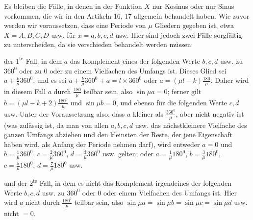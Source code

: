 \begingroup
\renewcommand{\arraystretch}{1.45}
Es bleiben die Fälle, in denen in der Funktion $X$ nur Kosinus oder nur Sinus vorkommen, die wir in den Artikeln 16, 17 allgemein behandelt haben. Wie zuvor werden wir voraussetzen, dass eine Periode von $\mu$ Gliedern gegeben ist, etwa $X=A,B,C,D$ usw. für $x=a,b,c,d$ usw. Hier sind jedoch zwei Fälle sorgfältig zu unterscheiden, da sie verschieden behandelt werden müssen:

der $1^{\mathrm{te}}$ Fall, in dem $a$ das Komplement eines der folgenden Werte $b,c,d$ usw. zu $360^{0}$ oder zu $0$ oder zu einem Vielfachen des Umfangs ist. Dieses Glied sei $a+\frac{k}{\mu}360^{0}$,
und es sei $a+\frac{k}{\mu}360^{0}+a=l\times360^{0}$ oder $a=(\mu l-k)\frac{180}{\mu}$. Daher wird in diesem Fall $a$ durch $\frac{180}{\mu}$ teilbar sein, also $\sin\mu a=0$; ferner gilt $b=(\mu l-k+2)\frac{180^{0}}{\mu}$ und $\sin\mu b=0$, und ebenso für die folgenden Werte $c,d$ usw. Unter der Voraussetzung also, dass $a$ kleiner als $\frac{360^{0}}{\mu}$, aber nicht negativ ist (was zulässig ist, da man von allen $a,b,c,d$ usw. das nächstkleinere Vielfache des ganzen Umfangs abziehen und den kleinsten der Reste, der jene Eigenschaft haben wird, als Anfang der Periode nehmen darf), wird entweder $a=0$ und $b=\frac1\mu360^{0}$, $c=\frac2\mu360^{0}$, $d=\frac3\mu360^{0}$ usw. gelten; oder $a=\frac1\mu180^{0}$, $b=\frac3\mu180^{0}$, $c=\frac5\mu180^{0}$, $d=\frac7\mu180^{0}$ usw.

und der $2^{\mathrm{te}}$ Fall, in dem es nicht das Komplement irgendeines der folgenden Werte $b,c,d$ usw. zu $360^{0}$ oder $0$ oder einem Vielfachen des Umfangs ist. Hier wird $a$ nicht durch $\frac{180^{0}}{\mu}$ teilbar sein, also $\sin\mu a=\sin\mu b=\sin\mu c=\sin\mu d$ usw. nicht $=0$.

